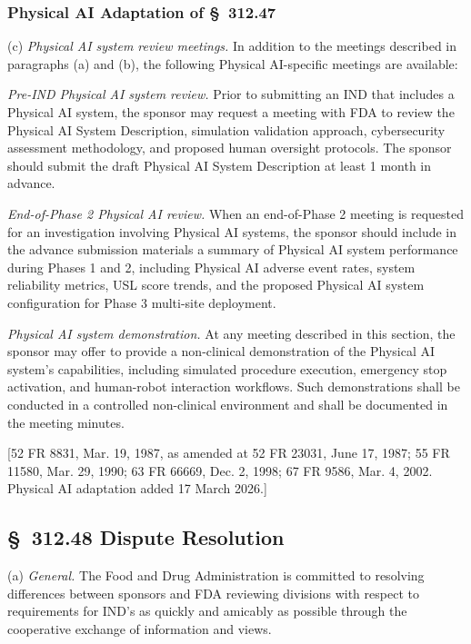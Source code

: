 \documentclass[11pt]{article}
\begin{document}
\subsubsection{Physical AI Adaptation of \S~312.47}

(c) \textit{Physical AI system review meetings.} In addition to the meetings described in paragraphs (a) and (b), the following Physical AI-specific meetings are available:

\begin{description}[leftmargin=0.8cm,style=sameline]
\item[(i)] \textit{Pre-IND Physical AI system review.} Prior to submitting an IND that includes a Physical AI system, the sponsor may request a meeting with FDA to review the Physical AI System Description, simulation validation approach, cybersecurity assessment methodology, and proposed human oversight protocols. The sponsor should submit the draft Physical AI System Description at least 1 month in advance.
\item[(ii)] \textit{End-of-Phase 2 Physical AI review.} When an end-of-Phase 2 meeting is requested for an investigation involving Physical AI systems, the sponsor should include in the advance submission materials a summary of Physical AI system performance during Phases 1 and 2, including Physical AI adverse event rates, system reliability metrics, USL score trends, and the proposed Physical AI system configuration for Phase 3 multi-site deployment.
\item[(iii)] \textit{Physical AI system demonstration.} At any meeting described in this section, the sponsor may offer to provide a non-clinical demonstration of the Physical AI system's capabilities, including simulated procedure execution, emergency stop activation, and human-robot interaction workflows. Such demonstrations shall be conducted in a controlled non-clinical environment and shall be documented in the meeting minutes.
\end{description}

[52 FR 8831, Mar. 19, 1987, as amended at 52 FR 23031, June 17, 1987; 55 FR 11580, Mar. 29, 1990; 63 FR 66669, Dec. 2, 1998; 67 FR 9586, Mar. 4, 2002. Physical AI adaptation added 17 March 2026.]

\subsection{\S~312.48 Dispute Resolution}

(a) \textit{General.} The Food and Drug Administration is committed to resolving differences between sponsors and FDA reviewing divisions with respect to requirements for IND's as quickly and amicably as possible through the cooperative exchange of information and views.
\end{document}
